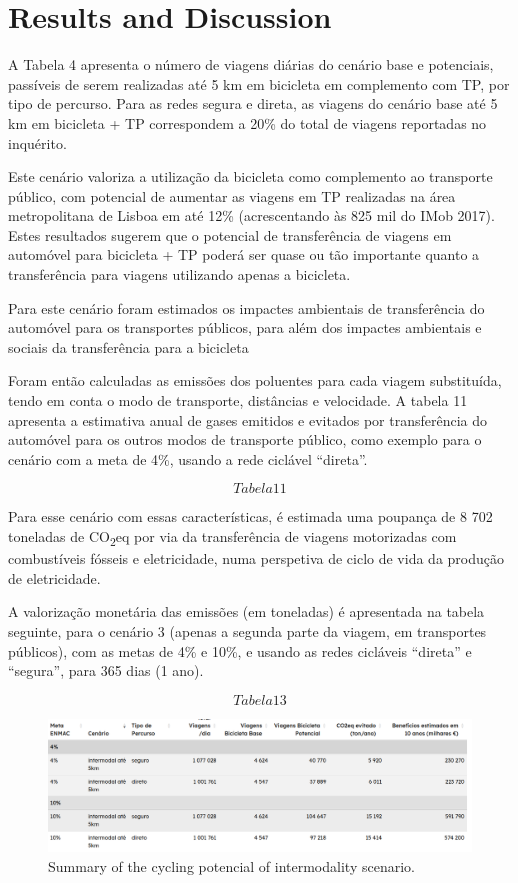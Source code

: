 \documentclass[runningheads]{llncs}
\begin{document}
\hypertarget{results-and-discussion}{%
\section{Results and Discussion}\label{results-and-discussion}}

A Tabela 4 apresenta o número de viagens diárias do cenário base e
potenciais, passíveis de serem realizadas até 5 km em bicicleta em
complemento com TP, por tipo de percurso. Para as redes segura e direta,
as viagens do cenário base até 5 km em bicicleta + TP correspondem a
20\% do total de viagens reportadas no inquérito.

Este cenário valoriza a utilização da bicicleta como complemento ao
transporte público, com potencial de aumentar as viagens em TP
realizadas na área metropolitana de Lisboa em até 12\% (acrescentando às
825 mil do IMob 2017). Estes resultados sugerem que o potencial de
transferência de viagens em automóvel para bicicleta + TP poderá ser
quase ou tão importante quanto a transferência para viagens utilizando
apenas a bicicleta.

Para este cenário foram estimados os impactes ambientais de
transferência do automóvel para os transportes públicos, para além dos
impactes ambientais e sociais da transferência para a bicicleta

Foram então calculadas as emissões dos poluentes para cada viagem
substituída, tendo em conta o modo de transporte, distâncias e
velocidade. A tabela 11 apresenta a estimativa anual de gases emitidos e
evitados por transferência do automóvel para os outros modos de
transporte público, como exemplo para o cenário com a meta de 4\%,
usando a rede ciclável ``direta''.

\[Tabela 11\]

Para esse cenário com essas características, é estimada uma poupança de
8 702 toneladas de CO\textsubscript{2}eq por via da transferência de
viagens motorizadas com combustíveis fósseis e eletricidade, numa
perspetiva de ciclo de vida da produção de eletricidade.

A valorização monetária das emissões (em toneladas) é apresentada na
tabela seguinte, para o cenário 3 (apenas a segunda parte da viagem, em
transportes públicos), com as metas de 4\% e 10\%, e usando as redes
cicláveis ``direta'' e ``segura'', para 365 dias (1 ano).

\[Tabela 13\]

\begin{figure}
\includegraphics[width=1\linewidth,]{img/table1} \caption{Summary of the cycling potencial of intermodality scenario.}\label{fig:summary1}
\end{figure}
\end{document}
